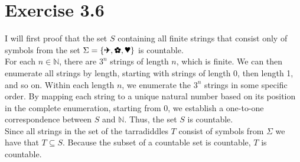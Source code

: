\documentclass{article} %
\newcommand{\homeworkNumber}{3}
\newcommand{\plane}{\text{\ding{40}}}
\newcommand{\heart}{\text{\ding{95}}}
\newcommand{\flower}{\text{\ding{170}}}
\begin{document}
\section*{Exercise \homeworkNumber.6}
I will first proof that the set \( S \) containing all finite strings that consist
only of symbols from the set \(  \Sigma = \left\{ \plane, \heart, \flower \right\}  \) is countable. \\
For each \( n \in \mathbb{N} \), there are \( 3^n \) strings of length \( n \), which is finite.
We can then enumerate all strings by length, starting with strings of length 0, then length 1, and so on.
Within each length \( n \), we enumerate the \( 3^n \) strings in some specific order.
By mapping each string to a unique natural number based on its position in the complete enumeration, starting from 0, we establish a one-to-one correspondence between \( S \) and \( \mathbb{N} \).
Thus, the set \( S \) is countable. \\
Since all strings in the set of the tarradiddles \( T \) consist of symbols from \( \Sigma \) we have that \( T \subseteq S \). Because the subset of a countable set is countable, \( T \) is countable.
\end{document}
